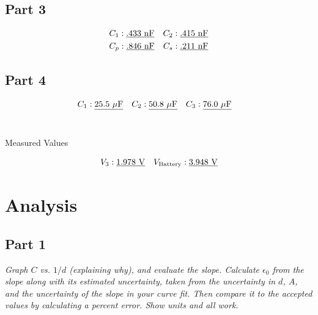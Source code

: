 \documentclass[twocolumn,english]{IEEEtran}
\theoremstyle{plain}
\theoremstyle{plain}
\begin{document}
  \subsection*{\textbf{Part 3}}
  \begin{align*}
  &C_1: \text{\underline{.433 nF}} &C_2: \text{\underline{.415 nF}} \\
  &C_p: \text{\underline{.846 nF}} &C_s: \text{\underline{.211 nF}}
  \end{align*}
  \subsection*{\textbf{Part 4}}
  \begin{align*}
  &C_1:\text{\underline{25.5 $\mu$F}} & &C_2:\text{\underline{50.8 $\mu$F}} & &C_3:\text{\underline{76.0 $\mu$F}}
  \end{align*}\\
  \begin{center}
  Measured Values
  \end{center}
  \begin{align*}
  &V_3: \text{\underline{1.978 V}} &V_{\text{Battery}}: \text{\underline{3.948 V}}
  \end{align*}


\section{Analysis}
  \subsection*{\textbf{Part 1}}
  \textit{Graph $C$ vs. $1/d$ (explaining why), and evaluate the slope. Calculate $\epsilon_0$ from the slope along with its estimated uncertainty, taken from the uncertainty in $d$, $A$, and the uncertainty of the slope in your curve fit. Then compare it to the accepted values by calculating a percent error. Show units and all work.}
\end{document}
